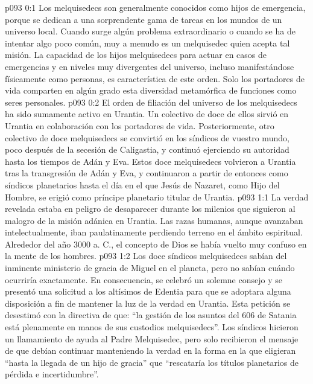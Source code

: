 \author{Melquisedec}
\vs p093 0:1 Los melquisedecs son generalmente conocidos como hijos de emergencia, porque se dedican a una sorprendente gama de tareas en los mundos de un universo local. Cuando surge algún problema extraordinario o cuando se ha de intentar algo poco común, muy a menudo es un melquisedec quien acepta tal misión. La capacidad de los hijos melquisedecs para actuar en casos de emergencias y en niveles muy divergentes del universo, incluso manifestándose físicamente como personas, es característica de este orden. Solo los portadores de vida comparten en algún grado esta diversidad metamórfica de funciones como seres personales.
\vs p093 0:2 \pc El orden de filiación del universo de los melquisedecs ha sido sumamente activo en Urantia. Un colectivo de doce de ellos sirvió en Urantia en colaboración con los portadores de vida. Posteriormente, otro colectivo de doce melquisedecs se convirtió en los síndicos de vuestro mundo, poco después de la secesión de Caligastia, y continuó ejerciendo su autoridad hasta los tiempos de Adán y Eva. Estos doce melquisedecs volvieron a Urantia tras la transgresión de Adán y Eva, y continuaron a partir de entonces como síndicos planetarios hasta el día en el que Jesús de Nazaret, como Hijo del Hombre, se erigió como príncipe planetario titular de Urantia.
\vs p093 1:1 La verdad revelada estaba en peligro de desaparecer durante los milenios que siguieron al malogro de la misión adánica en Urantia. Las razas humanas, aunque avanzaban intelectualmente, iban paulatinamente perdiendo terreno en el ámbito espiritual. Alrededor del año 3000 a. C., el concepto de Dios se había vuelto muy confuso en la mente de los hombres.
\vs p093 1:2 Los doce síndicos melquisedecs sabían del inminente ministerio de gracia de Miguel en el planeta, pero no sabían cuándo ocurriría exactamente. En consecuencia, se celebró un solemne consejo y se presentó una solicitud a los altísimos de Edentia para que se adoptara alguna disposición a fin de mantener la luz de la verdad en Urantia. Esta petición se desestimó con la directiva de que: “la gestión de los asuntos del 606 de Satania está plenamente en manos de sus custodios melquisedecs”. Los síndicos hicieron un llamamiento de ayuda al Padre Melquisedec, pero solo recibieron el mensaje de que debían continuar manteniendo la verdad en la forma en la que eligieran “hasta la llegada de un hijo de gracia” que “rescataría los títulos planetarios de pérdida e incertidumbre”.
